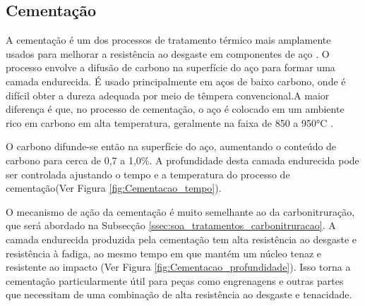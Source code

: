 \subsection{Cementação} \label{ssec:soa_tratamentos_cementação}
A cementação é um dos processos de tratamento térmico mais amplamente usados para melhorar a resistência ao desgaste em componentes de aço \cite{ASM_International1991}. O processo envolve a difusão de carbono na superfície do aço para formar uma camada endurecida. É usado principalmente em aços de baixo carbono, onde é difícil obter a dureza adequada por meio de têmpera convencional.A maior diferença é que, no processo de cementação, o aço é colocado em um ambiente rico em carbono em alta temperatura, geralmente na faixa de 850 a 950°C \cite{ASM_International1991}.
\newpage
\par
O carbono difunde-se então na superfície do aço, aumentando o conteúdo de carbono para cerca de 0,7 a 1,0\%. A profundidade desta camada endurecida pode ser controlada ajustando o tempo e a temperatura do processo de cementação\cite{Dychto2015}(Ver Figura \ref{fig:Cementacao_tempo}).
\par
O mecanismo de ação da cementação é muito semelhante ao da carbonitruração, que será abordado na Subsecção \ref{ssec:soa_tratamentos_carbonitruracao}. A camada endurecida produzida pela cementação tem alta resistência ao desgaste e resistência à fadiga, ao mesmo tempo em que mantém um núcleo tenaz e resistente ao impacto (Ver Figura \ref{fig:Cementacao_profundidade}). Isso torna a cementação particularmente útil para peças como engrenagens e outras partes que necessitam de uma combinação de alta resistência ao desgaste e tenacidade.
